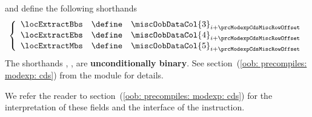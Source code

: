 \begin{description}
\begin{description}
\[{						}
				\]
				and define the following shorthands
				\[
					\left\{ \begin{array}{lclc}
						\locExtractBbs & \define & \miscOobDataCol {3} _{i + \prcModexpCdsMiscRowOffset} \\
						\locExtractEbs & \define & \miscOobDataCol {4} _{i + \prcModexpCdsMiscRowOffset} \\
						\locExtractMbs & \define & \miscOobDataCol {5} _{i + \prcModexpCdsMiscRowOffset} \\
					\end{array} \right.
				\]
				\saNote{} \label{hub: instruction handling: call: precompiles: modexp: common constraints: extract bbs ebs and mbs OOB shorthands are binary}
				The shorthands
				\locExtractBbs{},
				\locExtractEbs{},
				\locExtractMbs{}
				are \textbf{unconditionally binary}.
				See section~(\ref{oob: precompiles: modexp: cds})
				from the \oobMod{} module for details.
		\end{description}
\end{description}
We refer the reader to section~(\ref{oob: precompiles: modexp: cds}) for the interpretation of these fields and the interface of the \oobInstModexpCds{} instruction. 

